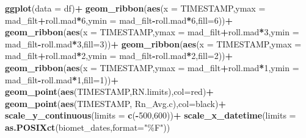 \documentclass[
]{article}
\newenvironment{Shaded}{\begin{snugshade}}{\end{snugshade}}
\newcommand{\AttributeTok}[1]{\textcolor[rgb]{0.13,0.29,0.53}{#1}}
\newcommand{\DecValTok}[1]{\textcolor[rgb]{0.00,0.00,0.81}{#1}}
\newcommand{\FunctionTok}[1]{\textcolor[rgb]{0.13,0.29,0.53}{\textbf{#1}}}
\newcommand{\NormalTok}[1]{#1}
\newcommand{\SpecialCharTok}[1]{\textcolor[rgb]{0.81,0.36,0.00}{\textbf{#1}}}
\newcommand{\StringTok}[1]{\textcolor[rgb]{0.31,0.60,0.02}{#1}}
\begin{document}
\begin{Shaded}
\begin{Highlighting}[]
\FunctionTok{ggplot}\NormalTok{(}\AttributeTok{data =}\NormalTok{ df)}\SpecialCharTok{+}
  \FunctionTok{geom\_ribbon}\NormalTok{(}\FunctionTok{aes}\NormalTok{(}\AttributeTok{x =}\NormalTok{ TIMESTAMP,}\AttributeTok{ymax =}\NormalTok{ mad\_filt}\SpecialCharTok{+}\NormalTok{roll.mad}\SpecialCharTok{*}\DecValTok{6}\NormalTok{,}\AttributeTok{ymin =}\NormalTok{ mad\_filt}\SpecialCharTok{{-}}\NormalTok{roll.mad}\SpecialCharTok{*}\DecValTok{6}\NormalTok{,}\AttributeTok{fill=}\StringTok{\textquotesingle{}6\textquotesingle{}}\NormalTok{))}\SpecialCharTok{+}
  \FunctionTok{geom\_ribbon}\NormalTok{(}\FunctionTok{aes}\NormalTok{(}\AttributeTok{x =}\NormalTok{ TIMESTAMP,}\AttributeTok{ymax =}\NormalTok{ mad\_filt}\SpecialCharTok{+}\NormalTok{roll.mad}\SpecialCharTok{*}\DecValTok{3}\NormalTok{,}\AttributeTok{ymin =}\NormalTok{ mad\_filt}\SpecialCharTok{{-}}\NormalTok{roll.mad}\SpecialCharTok{*}\DecValTok{3}\NormalTok{,}\AttributeTok{fill=}\StringTok{\textquotesingle{}3\textquotesingle{}}\NormalTok{))}\SpecialCharTok{+}
  \FunctionTok{geom\_ribbon}\NormalTok{(}\FunctionTok{aes}\NormalTok{(}\AttributeTok{x =}\NormalTok{ TIMESTAMP,}\AttributeTok{ymax =}\NormalTok{ mad\_filt}\SpecialCharTok{+}\NormalTok{roll.mad}\SpecialCharTok{*}\DecValTok{2}\NormalTok{,}\AttributeTok{ymin =}\NormalTok{ mad\_filt}\SpecialCharTok{{-}}\NormalTok{roll.mad}\SpecialCharTok{*}\DecValTok{2}\NormalTok{,}\AttributeTok{fill=}\StringTok{\textquotesingle{}2\textquotesingle{}}\NormalTok{))}\SpecialCharTok{+}
  \FunctionTok{geom\_ribbon}\NormalTok{(}\FunctionTok{aes}\NormalTok{(}\AttributeTok{x =}\NormalTok{ TIMESTAMP,}\AttributeTok{ymax =}\NormalTok{ mad\_filt}\SpecialCharTok{+}\NormalTok{roll.mad}\SpecialCharTok{*}\DecValTok{1}\NormalTok{,}\AttributeTok{ymin =}\NormalTok{ mad\_filt}\SpecialCharTok{{-}}\NormalTok{roll.mad}\SpecialCharTok{*}\DecValTok{1}\NormalTok{,}\AttributeTok{fill=}\StringTok{\textquotesingle{}1\textquotesingle{}}\NormalTok{))}\SpecialCharTok{+}
  \FunctionTok{geom\_point}\NormalTok{(}\FunctionTok{aes}\NormalTok{(TIMESTAMP,RN.limits),}\AttributeTok{col=}\StringTok{\textquotesingle{}red\textquotesingle{}}\NormalTok{)}\SpecialCharTok{+}
  \FunctionTok{geom\_point}\NormalTok{(}\FunctionTok{aes}\NormalTok{(TIMESTAMP, Rn\_Avg.c),}\AttributeTok{col=}\StringTok{\textquotesingle{}black\textquotesingle{}}\NormalTok{)}\SpecialCharTok{+}
  \FunctionTok{scale\_y\_continuous}\NormalTok{(}\AttributeTok{limits =} \FunctionTok{c}\NormalTok{(}\SpecialCharTok{{-}}\DecValTok{500}\NormalTok{,}\DecValTok{600}\NormalTok{))}\SpecialCharTok{+}
  \FunctionTok{scale\_x\_datetime}\NormalTok{(}\AttributeTok{limits =} \FunctionTok{as.POSIXct}\NormalTok{(biomet\_dates,}\AttributeTok{format=}\StringTok{"\%F"}\NormalTok{))}
\end{Highlighting}
\end{Shaded}
\end{document}
